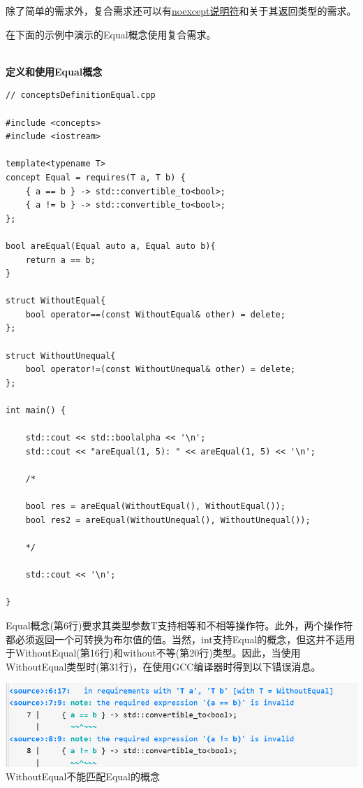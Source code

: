 除了简单的需求外，复合需求还可以有\href{https://en.cppreference.com/w/cpp/language/noexcept_spec}{noexcept说明符}和关于其返回类型的需求。

在下面的示例中演示的Equal概念使用复合需求。

\hspace*{\fill} \\ %
\noindent
\textbf{定义和使用Equal概念}
\begin{lstlisting}[style=styleCXX]
// conceptsDefinitionEqual.cpp

#include <concepts>
#include <iostream>

template<typename T>
concept Equal = requires(T a, T b) {
	{ a == b } -> std::convertible_to<bool>;
	{ a != b } -> std::convertible_to<bool>;
};

bool areEqual(Equal auto a, Equal auto b){
	return a == b;
}

struct WithoutEqual{
	bool operator==(const WithoutEqual& other) = delete;
};

struct WithoutUnequal{
	bool operator!=(const WithoutUnequal& other) = delete;
};

int main() {

	std::cout << std::boolalpha << '\n';
	std::cout << "areEqual(1, 5): " << areEqual(1, 5) << '\n';
	
	/*
	
	bool res = areEqual(WithoutEqual(), WithoutEqual());
	bool res2 = areEqual(WithoutUnequal(), WithoutUnequal());
	
	*/
	
	std::cout << '\n';

}
\end{lstlisting}

Equal概念(第6行)要求其类型参数T支持相等和不相等操作符。此外，两个操作符都必须返回一个可转换为布尔值的值。当然，int支持Equal的概念，但这并不适用于WithoutEqual(第16行)和without不等(第20行)类型。因此，当使用WithoutEqual类型时(第31行)，在使用GCC编译器时得到以下错误消息。

\begin{center}
\includegraphics[width=1.0\textwidth]{content/3/chapter4/images/1-4.png}\\
WithoutEqual不能匹配Equal的概念
\end{center}

